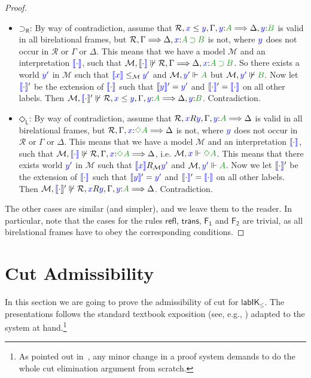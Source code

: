 \documentclass[a4paper]{article}
\theoremstyle{plain}
\theoremstyle{definition}
\newcommand*{\IK}{\mathsf{IK}}
\newcommand*{\labIKp}{\lab\IK_{\le}}
\newcommand*{\IMP}{\mathbin{\supset}}%
\newcommand*{\DIA}{\mathord{\Diamond}}
\newcommand{\B}{\mathcal{R}}
\newcommand{\Left}{\Gamma} %
\newcommand{\Right}{\Delta} %
\newcommand*{\fm}[1]{{\color{notgreen}{#1}}}
\newcommand*{\lb}[1]{{\color{blue}{#1}}}
\newcommand*{\rel}{R}
\newcommand*{\labels}[2]{\lb{#1}\mathord{:}\fm{#2}}
\newcommand*{\accs}[2]{\lb{#1}R\lb{#2}}
\newcommand*{\futs}[2]{\lb{#1}\le{\lb{#2}}}
\newcommand{\SEQ}{\Longrightarrow}
\newcommand*{\rn}[1]  {\ensuremath{\mathsf{#1}}}
\newcommand*{\lab}{\mathsf{lab}}
\newcommand*{\rlabrn}[2][]  {\rn{#2}_\rn{R#1}}%
\newcommand*{\llabrn}[2][]  {\rn{#2}_\rn{L#1}}%
\newcommand{\M}{\mathcal{M}}
\newcommand{\inter}[1]{\lb{\llbracket #1\rrbracket}}
\newcommand{\nforce}[3]{#1,#2\not\Vdash#3}
\newcommand{\cforce}[3]{#1,\lb{#2}\Vdash\fm{#3}}
\begin{document}
\begin{proof}
\begin{itemize}
		\item $\rlabrn\IMP$: By way of contradiction, assume that $\B, \futs xy, \Left, \labels{y}{A} \SEQ \Right, \labels{y}{B}$ is valid in all birelational frames, but $\B, \Left \SEQ \Right, \labels{x}{A \IMP B}$ is not, where $\lb y$ does not occur in $\B$ or $\Left$ or $\Right$. This means that we have a model $\M$ and an interpretation $\inter\cdot$, such that $\nforce\M{\inter\cdot}{\B, \Left \SEQ \Right, \labels{x}{A \IMP B}}$. So there exists a world $\lb{y'}$ in $\M$ such that $\inter x\le_\M \lb{y'}$ and $\cforce\M{y'}{A}$ but $\nforce\M{\lb{y'}}{\fm B}$. Now let 	$\inter\cdot'$ be the extension of $\inter\cdot$ such that $\inter y'=\lb{y'}$ and $\inter\cdot'=\inter\cdot$ on all other labels. Then $\nforce\M{\inter\cdot'}{\B, \futs xy, \Left, \labels{y}{A} \SEQ \Right, \labels{y}{B}}$. Contradiction.
		
		\item $\llabrn\DIA$: By way of contradiction, assume that $\B, \accs xy, \Left, \labels{y}{A} \SEQ \Right$ is valid in all birelational frames, but $\B, \Left, \labels{x}{\DIA A} \SEQ \Right$ is not, where $\lb y$ does not occur in $\B$ or $\Left$ or $\Right$. This means that we have a model $\M$ and an interpretation $\inter\cdot$, such that $\nforce\M{\inter\cdot}{\B, \Left, \labels{x}{\DIA A} \SEQ \Right}$, i.e. $\cforce \M x{\DIA A}$. This means that there exists world $\lb{y'}$ in $\M$ such that $\inter x\rel_\M \lb{y'}$ and $\cforce \M {\lb{y'}}{A}$. Now we let $\inter\cdot'$ be the extension of $\inter\cdot$ such that $\inter y'=\lb{y'}$ and $\inter\cdot' = \inter\cdot$ on all other labels. Then $\nforce\M{\inter\cdot'}{\B, \accs xy, \Left, \labels{y}{A} \SEQ \Right}$. Contradiction.
		
	\end{itemize}
	The other cases are similar (and simpler), and we leave them to the
	reader. In particular, note that the cases for the rules $\rn{refl}$,
	$\rn{trans}$, $\rn{F_1}$ and $\rn{F_2}$ are trivial, as all
	birelational frames have to obey the corresponding conditions.
\end{proof}

\section{Cut Admissibility}\label{sec:cut-elim}
In this section we are going to prove the admissibility of cut for
$\labIKp$. The presentations follows the standard textbook
exposition (see, e.g., \cite{troelstra:schwichtenberg:00,negri:vonplato:01})
adapted to the system at hand.\footnote{As pointed out
	in~\cite{girard:87:a}, any minor change in a proof system demands
	to do the whole cut elimination argument from scratch.}
\end{document}
